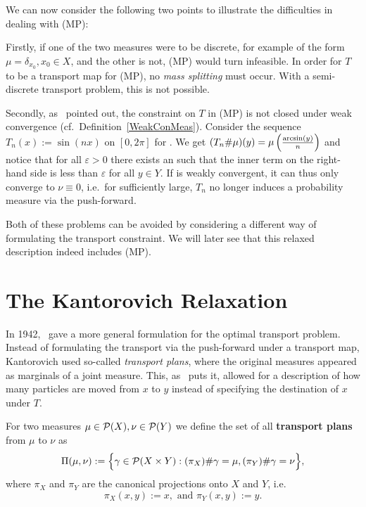 We can now consider the following two points to illustrate the difficulties in dealing with (MP):

Firstly, if one of the two measures were to be discrete, for example of the form $\mu = \delta_{x_0}, x_0 \in X$, and the other is not, (MP) would turn infeasible. In order for $T$ to be a transport map for (MP), no \textit{mass splitting} must occur. With a semi-discrete transport problem, this is not possible.

Secondly, as~\cite{San2015} pointed out, the constraint on $T$ in (MP) is not closed under weak convergence (cf.\ Definition~\ref{WeakConMeas}). Consider the sequence $T_n(x) := \sin(nx)$ on $[0, 2 \pi]$ for \NinN. We get $(\push[T_n]{\mu})(y) = \mu\left( \frac{\arcsin(y)}{n} \right)$ and notice that for all $\varepsilon > 0$ there exists an \NinN{} such that the inner term on the right-hand side is less than $\varepsilon$ for all $y \in Y$. If \push[T_n]{\mu} is weakly convergent, it can thus only converge to $\nu \equiv 0$, i.e.\ for \NinN{} sufficiently large, $T_n$ no longer induces a probability measure via the push-forward.

Both of these problems can be avoided by considering a different way of formulating the transport constraint. We will later see that this relaxed description indeed includes (MP).

\section{The Kantorovich Relaxation}\label{KantRelax}
In 1942,\ \cite{Kan1942} gave a more general formulation for the optimal transport problem. Instead of formulating the transport via the push-forward under a transport map, Kantorovich used so-called \textit{transport plans}, where the original measures appeared as marginals of a joint measure. This, as~\cite{San2015} puts it,  allowed for a description of how many particles are moved from $x$ to $y$ instead of specifying the destination of $x$ under $T$.

\begin{definition}\label{TransPlans}
	For two measures $\mu \in \PM{X}, \nu \in \PM{Y}$ we define the set of all \textbf{transport plans} from $\mu$ to $\nu$ as
	\[ \TP{\mu}{\nu} := \Big\{ \gamma \in \PM{X \times Y} : \push[(\pi_X)]{\gamma} = \mu, \push[(\pi_Y)]{\gamma} = \nu \Big\}, \]
	where $\pi_X$ and $\pi_Y$ are the canonical projections onto $X$ and $Y$, i.e.
	\[ \pi_X(x, y) := x, \text{ and } \pi_Y(x, y) := y. \]
\end{definition}

